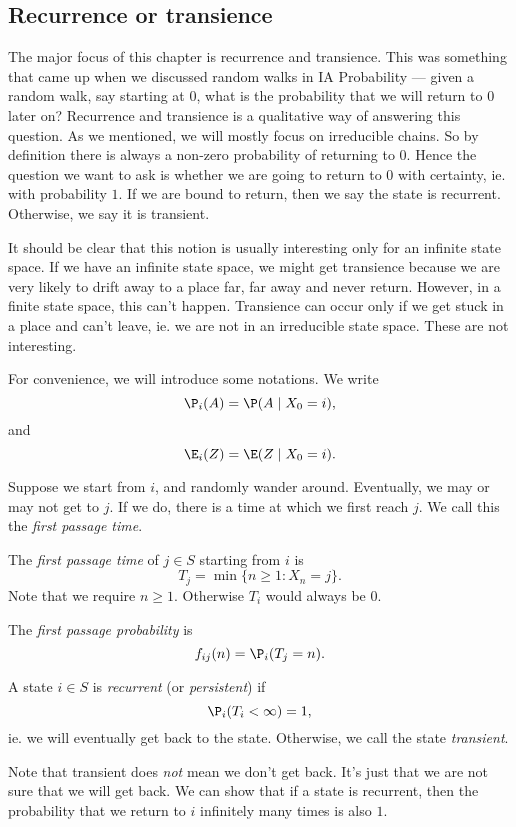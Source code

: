 \documentclass[a4paper]{article}
\begin{document}
\subsection{Recurrence or transience}
The major focus of this chapter is recurrence and transience. This was something that came up when we discussed random walks in IA Probability --- given a random walk, say starting at $0$, what is the probability that we will return to $0$ later on? Recurrence and transience is a qualitative way of answering this question. As we mentioned, we will mostly focus on irreducible chains. So by definition there is always a non-zero probability of returning to $0$. Hence the question we want to ask is whether we are going to return to $0$ with certainty, ie. with probability $1$. If we are bound to return, then we say the state is recurrent. Otherwise, we say it is transient.

It should be clear that this notion is usually interesting only for an infinite state space. If we have an infinite state space, we might get transience because we are very likely to drift away to a place far, far away and never return. However, in a finite state space, this can't happen. Transience can occur only if we get stuck in a place and can't leave, ie. we are not in an irreducible state space. These are not interesting.

\begin{notation}
  For convenience, we will introduce some notations. We write
  \[
    \P_i(A) = \P(A\mid X_0 = i),
  \]
  and
  \[
    \E_i(Z) = \E(Z\mid X_0 = i).
  \]
\end{notation}

Suppose we start from $i$, and randomly wander around. Eventually, we may or may not get to $j$. If we do, there is a time at which we first reach $j$. We call this the \emph{first passage time}.

\begin{defi}
  The \emph{first passage time} of $j \in S$ starting from $i$ is
  \[
    T_j = \min\{n \geq 1: X_n = j\}.
  \]
  Note that we require $n \geq 1$. Otherwise $T_i$ would always be $0$.

  The \emph{first passage probability} is
  \[
    f_{ij}(n) = \P_i(T_j = n).
  \]
\end{defi}

\begin{defi}
  A state $i\in S$ is \emph{recurrent} (or \emph{persistent}) if
  \[
    \P_i (T_i < \infty) = 1,
  \]
  ie. we will eventually get back to the state. Otherwise, we call the state \emph{transient}.
\end{defi}
Note that transient does \emph{not} mean we don't get back. It's just that we are not sure that we will get back. We can show that if a state is recurrent, then the probability that we return to $i$ infinitely many times is also $1$.
\end{document}
